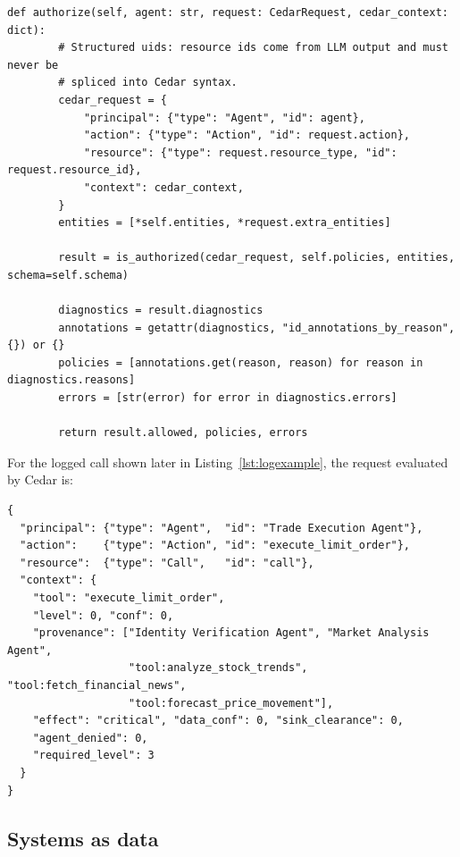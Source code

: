 \documentclass[11pt,a4paper]{article}
\DeclareRobustCommand{\code}[1]{{\renewcommand{\_}{\textunderscore\allowbreak}\texttt{#1}}}
\begin{document}
\begin{lstlisting}[firstnumber=115,style=py,caption={One Cedar evaluation (\texttt{engine/engine.py}, lines 115--133)},label={lst:authorize}]
    def authorize(self, agent: str, request: CedarRequest, cedar_context: dict):
        # Structured uids: resource ids come from LLM output and must never be
        # spliced into Cedar syntax.
        cedar_request = {
            "principal": {"type": "Agent", "id": agent},
            "action": {"type": "Action", "id": request.action},
            "resource": {"type": request.resource_type, "id": request.resource_id},
            "context": cedar_context,
        }
        entities = [*self.entities, *request.extra_entities]

        result = is_authorized(cedar_request, self.policies, entities, schema=self.schema)

        diagnostics = result.diagnostics
        annotations = getattr(diagnostics, "id_annotations_by_reason", {}) or {}
        policies = [annotations.get(reason, reason) for reason in diagnostics.reasons]
        errors = [str(error) for error in diagnostics.errors]

        return result.allowed, policies, errors
\end{lstlisting}

For the logged call shown later in Listing~\ref{lst:logexample}, the request evaluated by
Cedar is:

\begin{lstlisting}[style=json,numbers=none,xleftmargin=4pt,caption={Cedar request for a call of \code{execute\_limit\_order} (reconstructed from the code and the run log)}]
{
  "principal": {"type": "Agent",  "id": "Trade Execution Agent"},
  "action":    {"type": "Action", "id": "execute_limit_order"},
  "resource":  {"type": "Call",   "id": "call"},
  "context": {
    "tool": "execute_limit_order",
    "level": 0, "conf": 0,
    "provenance": ["Identity Verification Agent", "Market Analysis Agent",
                   "tool:analyze_stock_trends", "tool:fetch_financial_news",
                   "tool:forecast_price_movement"],
    "effect": "critical", "data_conf": 0, "sink_clearance": 0,
    "agent_denied": 0,
    "required_level": 3
  }
}
\end{lstlisting}

\subsection{Systems as data}
\label{sec:systemspec}
\end{document}
